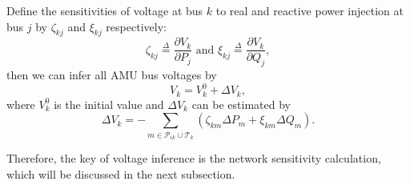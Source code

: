 \documentclass{article}
\begin{document}
Define the sensitivities of voltage at bus $k$ to real and reactive power injection at bus $j$ by $ \zeta_{kj}$ and $ \xi_{kj}$ respectively:
\begin{equation}
    \zeta_{kj} \overset{\Delta}{=} \frac{\partial V_k}{\partial P_j} \text{ and } \xi_{kj} \overset{\Delta}{=} \frac{\partial V_k}{\partial Q_j}  ,
\end{equation}
then we can infer all AMU bus voltages by
\begin{equation}
V_k=    V_k^0 + \Delta V_k,
\end{equation}
where $V_k^0$ is the initial value and $\Delta V_k$ can be estimated by
\begin{equation}
    \Delta V_k  =-\sum_{ m \in\mathcal{P}_{ik}\cup \mathcal{T}_k} (\zeta_{km}\Delta P_m+ \xi_{km} \Delta Q_m).\label{eq:vklnr}
\end{equation}

Therefore, the key of voltage inference is the network sensitivity calculation, which will be discussed in the next subsection.
\end{document}
